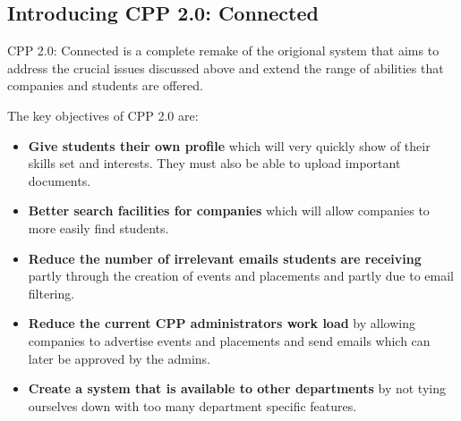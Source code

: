 \subsection{Introducing CPP 2.0: Connected}
CPP 2.0: Connected is a complete remake of the origional system that aims to address the crucial issues discussed above and extend the range of abilities that companies and students are offered.

The key objectives of CPP 2.0 are:
\begin{itemize}
  \item \textbf{Give students their own profile} which will very quickly show of their skills set and interests. They must also be able to upload important documents.
  \item \textbf{Better search facilities for companies} which will allow companies to more easily find students.
  \item \textbf{Reduce the number of irrelevant emails students are receiving} partly through the creation of events and placements and partly due to email filtering.
  \item \textbf{Reduce the current CPP administrators work load} by allowing companies to advertise events and placements and send emails which can later be approved by the admins.
  \item \textbf{Create a system that is available to other departments} by not tying ourselves down with too many department specific features.
\end{itemize}